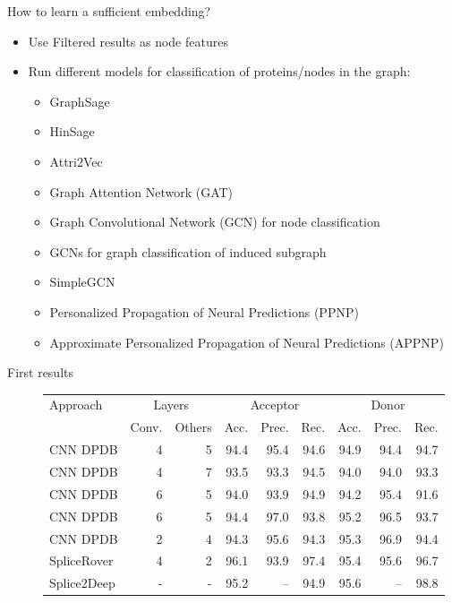 \documentclass[10pt]{beamer}
\begin{document}
\begin{frame}{How to learn a sufficient embedding?}
	\begin{itemize}
		\item Use Filtered results as node features
		\item Run different models for classification of proteins/nodes in the graph:
		\begin{itemize}
			\item GraphSage
			\item HinSage
			\item Attri2Vec
			\item Graph Attention Network (GAT)
			\item Graph Convolutional Network (GCN) for node classification
			\item GCNs for graph classification of induced subgraph
			\item SimpleGCN
			\item Personalized Propagation of Neural Predictions (PPNP)
			\item Approximate Personalized Propagation of Neural Predictions (APPNP)
		\end{itemize}
	\end{itemize}
	
\end{frame}

\begin{frame}{First results}
	\begin{figure}
		\small
		\centering
		\begingroup
		\def\arraystretch{1.2}
		\begin{tabular}{|l|r|r|r|r|r|r|r|r|}
			\hline
			Approach  & \multicolumn{2}{c}{Layers} & \multicolumn{3}{|c|}{Acceptor} & \multicolumn{3}{c|}{Donor} \\
			\cline{2-9}
			&Conv. & Others & Acc. & Prec. & Rec. & Acc. & Prec. & Rec. \\
			\hline
			CNN DPDB & 4 & 5 & 94.4 & 95.4 & 94.6 & 94.9 & 94.4 & 94.7 \\
			CNN DPDB & 4 & 7 & 93.5 & 93.3 & 94.5 & 94.0 & 94.0 & 93.3 \\
			CNN DPDB & 6 & 5 & 94.0 & 93.9 & 94.9 & 94.2 & 95.4 & 91.6 \\
			CNN DPDB & 6 & 5 & 94.4 & 97.0 & 93.8 & 95.2 & 96.5 & 93.7 \\
			CNN DPDB & 2 & 4 & 94.3 & 95.6 & 94.3 & 95.3 & 96.9 & 94.4 \\
			SpliceRover & 4 & 2 & 96.1 & 93.9 & 97.4 & 95.4 & 95.6 & 96.7 \\
			Splice2Deep & - & - & 95.2 &  -- & 94.9 & 95.6 & -- & 98.8\\
			
			\hline  
		\end{tabular}
		\endgroup
	\end{figure}
\end{frame}
\end{document}
